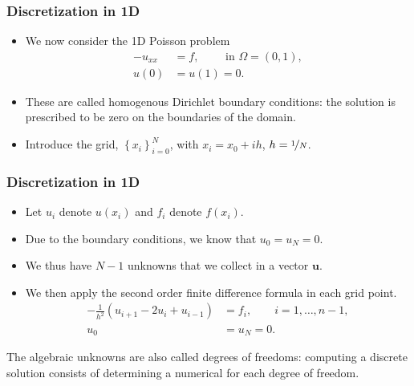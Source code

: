 \begin{frame}[fragile]
  \frametitle{Discretization in 1D}
  \begin{itemize}
  \item We now consider the 1D Poisson problem
    \[
      \begin{split}
        -u_{xx} &= f, \qquad \text{ in } \Omega = (0,1), \\
        u(0) &= u(1) = 0.
      \end{split}
    \]
    \begin{center}
      \scalebox{0.7}{}
    \end{center}
  \item These are called homogenous Dirichlet boundary conditions: the solution
    is prescribed to be zero on the boundaries of the domain.
  \item Introduce the grid, $\left\{x_i\right\}_{i=0}^N$, with $x_i = x_0+ih$,
    $h = \nicefrac{1}{N}$.
    \begin{center}
      
    \end{center}
  \end{itemize}
\end{frame}

\begin{frame}
  \frametitle{Discretization in 1D}
  \begin{itemize}
  \item Let $u_i$ denote $u(x_i)$ and $f_i$ denote $f(x_i)$.
  \item Due to the boundary conditions, we know that $u_0 = u_N = 0$.
  \item We thus have $N-1$ unknowns that we collect in a vector $\bm u$.
  \item We then apply the second order finite difference formula in each grid
    point.
    \begin{align*}
      - \frac{1}{h^2} \left(u_{i+1} - 2u_i + u_{i-1} \right) &= f_i, \qquad i=1,\ldots,n-1, \\
      u_0 &= u_N = 0.
    \end{align*}
  \end{itemize}

\medskip The algebraic unknowns are also called degrees of freedoms: computing a discrete solution consists of determining a numerical for each degree of freedom.
\end{frame}

